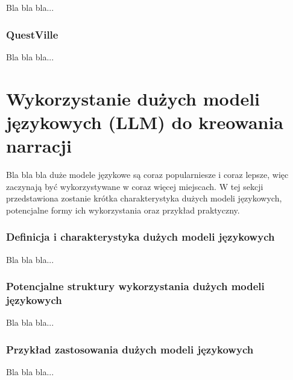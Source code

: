 Bla bla bla...

\subsubsection*{QuestVille}

Bla bla bla...

\section{Wykorzystanie dużych modeli językowych (LLM) do kreowania narracji}\label{section:ch2_2}

Bla bla bla duże modele językowe są coraz popularniesze i coraz lepsze, więc zaczynają być
wykorzystywane w coraz więcej miejscach. W tej sekcji przedstawiona zostanie krótka charakterystyka
dużych modeli językowych, potencjalne formy ich wykorzystania oraz przykład praktyczny.

\subsubsection*{Definicja i charakterystyka dużych modeli językowych}

Bla bla bla...

\subsubsection*{Potencjalne struktury wykorzystania dużych modeli językowych}

Bla bla bla...

\subsubsection*{Przykład zastosowania dużych modeli językowych}

Bla bla bla...